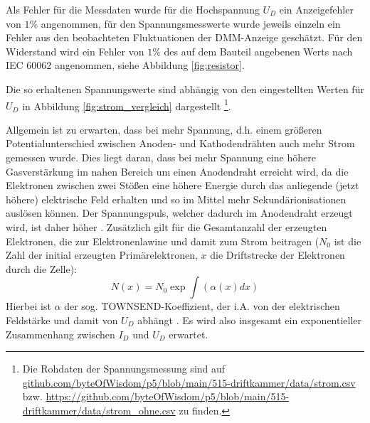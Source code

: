 Als Fehler für die Messdaten wurde für die Hochspannung $U_D$ ein Anzeigefehler von $1\%$ \cite[2]{515versuchsanleitung} angenommen, für den Spannungsmesswerte wurde jeweils einzeln ein Fehler aus den beobachteten Fluktuationen der DMM-Anzeige geschätzt. Für den Widerstand wird ein Fehler von $1\%$ des auf dem Bauteil angebenen Werts nach IEC 60062 \cite{resistorcode} angenommen, siehe Abbildung \ref{fig:resistor}.


Die so erhaltenen Spannungswerte sind abhängig von den eingestellten Werten für $U_D$ in Abbildung \ref{fig:strom_vergleich} dargestellt
\footnote{Die Rohdaten der Spannungsmessung sind auf \url{github.com/byteOfWisdom/p5/blob/main/515-driftkammer/data/strom.csv} bzw. \url{https://github.com/byteOfWisdom/p5/blob/main/515-driftkammer/data/strom_ohne.csv} zu finden.}.

Allgemein ist zu erwarten, dass bei mehr Spannung, d.h. einem größeren Potentialunterschied zwischen Anoden- und Kathodendrähten auch mehr Strom gemessen wurde. Dies liegt daran, dass bei mehr Spannung eine höhere Gasverstärkung im nahen Bereich um einen Anodendraht erreicht wird, da die Elektronen zwischen zwei Stößen eine höhere Energie durch das anliegende (jetzt höhere) elektrische Feld erhalten und so im Mittel mehr Sekundärionisationen auslösen können. Der Spannungspuls, welcher dadurch im Anodendraht erzeugt wird, ist daher höher \cite[22-23]{schwandiplom}. Zusätzlich gilt für die Gesamtanzahl der erzeugten Elektronen, die zur Elektronenlawine und damit zum Strom beitragen \cite[22]{schwandiplom} ($N_0$ ist die Zahl der initial erzeugten Primärelektronen, $x$ die Driftstrecke der Elektronen durch die Zelle): \[
N(x) = N_0 \exp{\int(\alpha(x)dx)}
\]
Hierbei ist $\alpha$ der sog. \uppercase{Townsend}-Koeffizient, der i.A. von der elektrischen Feldstärke und damit von $U_D$ abhängt \cite[189-192]{kolanoskiwermerdetektoren}. Es wird also insgesamt ein exponentieller Zusammenhang zwischen $I_D$ und $U_D$ erwartet.



